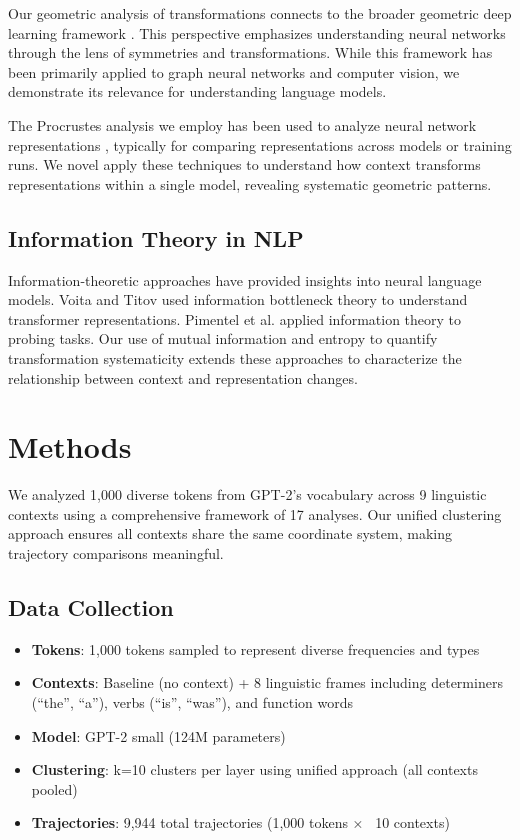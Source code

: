 \documentclass[11pt]{article}
\begin{document}
Our geometric analysis of transformations connects to the broader geometric deep learning framework \cite{bronstein2021geometric}. This perspective emphasizes understanding neural networks through the lens of symmetries and transformations. While this framework has been primarily applied to graph neural networks and computer vision, we demonstrate its relevance for understanding language models.

The Procrustes analysis we employ has been used to analyze neural network representations \cite{kornblith2019similarity, williams2021generalized}, typically for comparing representations across models or training runs. We novel apply these techniques to understand how context transforms representations within a single model, revealing systematic geometric patterns.

\subsection{Information Theory in NLP}

Information-theoretic approaches have provided insights into neural language models. Voita and Titov \cite{voita2020information} used information bottleneck theory to understand transformer representations. Pimentel et al. \cite{pimentel2020information} applied information theory to probing tasks. Our use of mutual information and entropy to quantify transformation systematicity extends these approaches to characterize the relationship between context and representation changes.

\section{Methods}

We analyzed 1,000 diverse tokens from GPT-2's vocabulary across 9 linguistic contexts using a comprehensive framework of 17 analyses. Our unified clustering approach ensures all contexts share the same coordinate system, making trajectory comparisons meaningful.

\subsection{Data Collection}
\begin{itemize}
\item \textbf{Tokens}: 1,000 tokens sampled to represent diverse frequencies and types
\item \textbf{Contexts}: Baseline (no context) + 8 linguistic frames including determiners (``the'', ``a''), verbs (``is'', ``was''), and function words
\item \textbf{Model}: GPT-2 small (124M parameters) 
\item \textbf{Clustering}: k=10 clusters per layer using unified approach (all contexts pooled)
\item \textbf{Trajectories}: 9,944 total trajectories (1,000 tokens × ~10 contexts)
\end{itemize}
\end{document}
